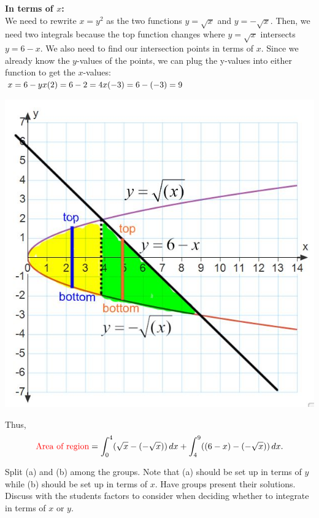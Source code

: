 \documentclass[noinstructornotes]{ximera}
\begin{document}
\begin{problem}
\begin{freeResponse}
		\textbf{In terms of $x$:}\\
		We need to rewrite $x=y^2$ as the two functions $y=\sqrt{x}$ and $y=-\sqrt{x}$.  Then,
		we need two integrals because the top function changes where $y=\sqrt{x}$ intersects $y=6-x$.
		We also need to find our intersection points in terms of $x$.  Since we already know the $y$-values of the points, 
		we can plug the y-values into either function to get the $x$-values:\\
		$x=6-y\\
		x(2)=6-2=4\\
		x(-3)=6-(-3)=9$\\
		\begin{image}
			\includegraphics[scale=0.5]{Figure6-2-4new2.jpg}
			\end{image}
			Thus,
		\[
		\text{{\color{red} Area of region}} =  \int_0^4 (\sqrt{x} - (-\sqrt{x})) \,d x + \int_4^9 ((6-x)-(-\sqrt{x})) \,d x .
		\]
		
		\end{freeResponse}
		


\end{problem}

\begin{instructorNotes}
Split (a) and (b) among the groups.  
Note that (a) should be set up in terms of $y$ while (b) should be set up in terms of $x$.  
Have groups present their solutions.  
Discuss with the students factors to consider when deciding whether to integrate in terms of $x$ or $y$.
\end{instructorNotes}
\end{document}

